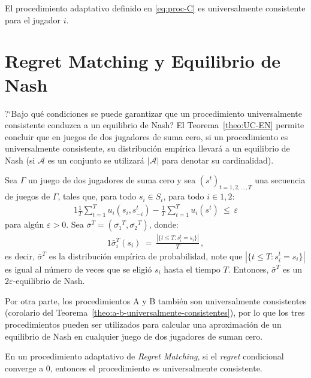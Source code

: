\begin{theorem}
\label{theo:conv-proc-C}
El procedimiento adaptativo definido en \eqref{eq:proc-C} es universalmente consistente para el jugador $i$.
\end{theorem}

\section{Regret Matching y Equilibrio de Nash}

?`Bajo qué condiciones se puede garantizar que un procedimiento universalmente consistente conduzca a un equilibrio de Nash? El Teorema~\ref{theo:UC-EN} permite concluir que en juegos de dos jugadores de suma cero, si un procedimiento es universalmente consistente, su distribución empírica llevará a un equilibrio de Nash (si $\mathcal{A}$ es un conjunto se utilizará $|\mathcal{A}|$ para denotar su cardinalidad).

\begin{theorem}
\label{theo:UC-EN}
Sea $\Gamma$ un juego de dos jugadores de suma cero y sea $(s^t)_{t=1,2,..., T}$ una secuencia de juegos de $\Gamma$, tales que, para todo $s_i \in S_i$, para todo $i \in {1, 2}$:
\begin{alignat}{1}
\frac{1}{T}\sum_{t = 1}^{T}u_i(s_i, s_{-i}^t) - \frac{1}{T} \sum_{t = 1}^T u_i(s^t)\ \leq\ \varepsilon
\end{alignat}
para algún $\varepsilon > 0$. Sea $\bar{\sigma}^T = (\bar{\sigma_1}^T, \bar{\sigma_2}^T)$, donde:
\begin{alignat}{1}
\bar{\sigma}_i^T(s_i)\ =\ \frac{|\{ t \leq T : s_i^t = s_i\}|}{T} \,,
\end{alignat}
es decir, $\bar{\sigma}^T$ es la distribución empírica de probabilidad, note que $|\{ t \leq T : s_i^t = s_i\}|$ es igual al número de veces que se eligió $s_i$ hasta el tiempo $T$. Entonces, $\bar{\sigma}^T$ es un $2\varepsilon$-equilibrio de Nash.
\end{theorem}

Por otra parte, los procedimientos A y B también son universalmente consistentes (corolario del Teorema~\ref{theo:a-b-universalmente-consistentes}), por lo que los tres procedimientos pueden ser utilizados para calcular una aproximación de un equilibrio de Nash en cualquier juego de dos jugadores de suman cero.

\begin{theorem}
\label{theo:a-b-universalmente-consistentes}
En un procedimiento adaptativo de \textit{Regret Matching}, si el \textit{regret} condicional converge a $0$, entonces el procedimiento es universalmente consistente.
\end{theorem}

